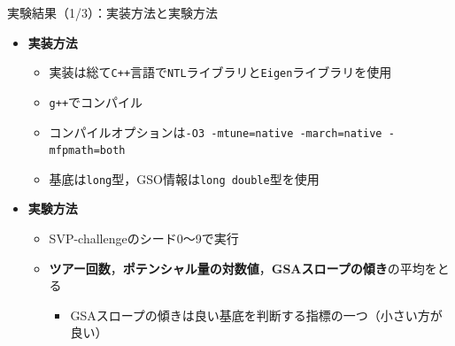 \documentclass[12pt,aspectratio=169,xcolor=dvipsnames,table,dvipdfmx, leqno]{beamer}
\begin{document}
\begin{frame}{実験結果（1/3）：実装方法と実験方法}
\begin{itemize}
    \item \textbf{実装方法}
    \begin{itemize}
        \item 実装は総て\texttt{C++}言語で\texttt{NTL}ライブラリ\cite{NTL}と\texttt{Eigen}ライブラリ\cite{Eigen}を使用
        \item \texttt{g++}でコンパイル
        \item コンパイルオプションは\texttt{-O3 -mtune=native -march=native -mfpmath=both}
        \item 基底は\texttt{long}型，GSO情報は\texttt{long double}型を使用
    \end{itemize}
    \item \textbf{実験方法}
    \begin{itemize}
        \item SVP-challenge\cite{SVP}のシード0～9で実行
        \item \textbf{ツアー回数}，\textbf{ポテンシャル量の対数値}，\textbf{GSAスロープの傾き}の平均をとる
        \begin{itemize}
            \item GSAスロープの傾きは良い基底を判断する指標の一つ（小さい方が良い）
        \end{itemize}
    \end{itemize}
\end{itemize}
\end{frame}
\end{document}
